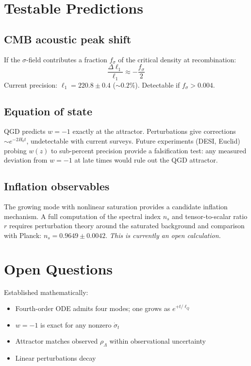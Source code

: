 \documentclass[11pt,a4paper]{article}
\theoremstyle{plain}
\theoremstyle{definition}
\theoremstyle{remark}
\newcommand{\lQ}{\ell_Q}
\begin{document}
\section{Testable Predictions}
\label{sec:predictions}

\subsection{CMB acoustic peak shift}

If the $\sigma$-field contributes a fraction $f_\sigma$ of the critical density at recombination:
\begin{equation}
  \frac{\Delta\ell_1}{\ell_1} \approx -\frac{f_\sigma}{2}
\end{equation}
Current precision: $\ell_1 = 220.8 \pm 0.4$ ($\sim 0.2\%$).  Detectable if $f_\sigma > 0.004$.

\subsection{Equation of state}

QGD predicts $w = -1$ exactly at the attractor.  Perturbations give corrections $\sim e^{-2H_0 t}$, undetectable with current surveys.  Future experiments (DESI, Euclid) probing $w(z)$ to sub-percent precision provide a falsification test: any measured deviation from $w = -1$ at late times would rule out the QGD attractor.

\subsection{Inflation observables}

The growing mode with nonlinear saturation provides a candidate inflation mechanism.  A full computation of the spectral index $n_s$ and tensor-to-scalar ratio $r$ requires perturbation theory around the saturated background and comparison with Planck: $n_s = 0.9649 \pm 0.0042$.  \emph{This is currently an open calculation.}

\section{Open Questions}
\label{sec:open}

Established mathematically:
\begin{itemize}
  \item Fourth-order ODE admits four modes; one grows as $e^{+t/\lQ}$
  \item $w = -1$ is exact for any nonzero $\dot\sigma_t$
  \item Attractor matches observed $\rho_\Lambda$ within observational uncertainty
  \item Linear perturbations decay
\end{itemize}
\end{document}
